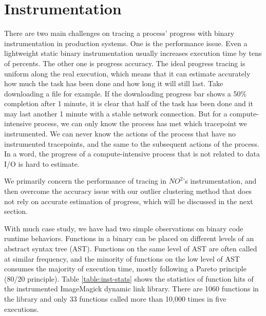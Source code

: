 \section{Instrumentation}

There are two main challenges on tracing a process' progress with binary instrumentation in production systems. One is the performance issue. Even a lightweight static binary instrumentation usually increases execution time by tens of percents. The other one is progress accuracy. The ideal progress tracing is uniform along the real execution, which means that it can estimate accurately how much the task has been done and how long it will still last. Take downloading a file for example. If the downloading progress bar shows a 50\% completion after 1 minute, it is clear that half of the task has been done and it may last another 1 minute with a stable network connection. But for a compute-intensive process, we can only know the process has met which tracepoint we instrumented. We can never know the actions of the process that have no instrumented tracepoints, and the same to the subsequent actions of the process. In a word, the progress of a compute-intensive process that is not related to data I/O is hard to estimate.

We primarily concern the performance of tracing in $NO^2$'s instrumentation, and then overcome the accuracy issue with our outlier clustering method that does not rely on accurate estimation of progress, which will be discussed in the next section.

With much case study, we have had two simple observations on binary code runtime behaviors. Functions in a binary can be placed on different levels of an abstract syntax tree (AST). Functions on the same level of AST are often called at similar frequency, and the minority of functions on the low level of AST consumes the majority of execution time, mostly following a Pareto principle (80/20 principle). Table \ref{table:inst-stats} shows the statistics of function hits of the instrumented ImageMagick dynamic link library. There are 1060 functions in the library and only 33 functions called more than 10,000 times in five executions.

